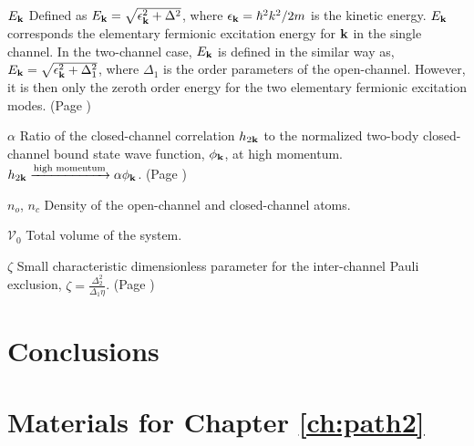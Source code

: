 \documentclass[edeposit,fullpage,prequest,10pt]{uiucthesis2009}
\begin{document}
\begin{symbollist}[0.7in]
\item[$E_{\mathbf{k}}$] Defined as $E_{\mathbf{k}}=\sqrt{\epsilon_{\mathbf{k}}^{2}+\Delta^{2}}$, where $\epsilon_{\mathbf{k}}=\hbar^{2}k^{2}/2m$ is the kinetic energy. $E_{\mathbf{k}}$ corresponds the elementary fermionic excitation energy for $\mathbf{k}$ in the single channel.   In the two-channel case, $E_{\mathbf{k}}$ is defined in the similar way as, $E_{\mathbf{k}}=\sqrt{\epsilon_{\mathbf{k}}^{2}+\Delta_{1}^{2}}$, where $\Delta_1$ is the order parameters of the open-channel. However, it is then only the zeroth order   energy for the two elementary fermionic excitation modes. (Page \pageref{eq:pathInt:G0})
\item[$\alpha$]  Ratio of the closed-channel correlation $h_{2\mathbf{k}}$ to the normalized two-body closed-channel bound state wave function, $\phi_{\mathbf{k}}$, at high momentum.  $h_{2\mathbf{k}} \xrightarrow{\text{high momentum}}\alpha\phi_{\mathbf{k}}$. (Page \pageref{eq:pathInt2:hphi})
\item[$n_{o}$, $n_{c}$] Density of the open-channel and closed-channel atoms. 
\item[$\mathcal{V}_{0}$]  Total volume of the system. 
\item[$\zeta$] Small characteristic dimensionless  parameter for the inter-channel Pauli exclusion, $\zeta=\frac{\Delta_{2}^{2}}{\Delta_{1}\eta}$. (Page \pageref{eq:pathInt2:zetaDef})
\end{symbollist}

\mainmatter




\chapter{Conclusions\label{ch:conclusion}}


\appendix

%

\chapter{Materials for Chapter \ref{ch:path2}}


\backmatter



\end{document}
